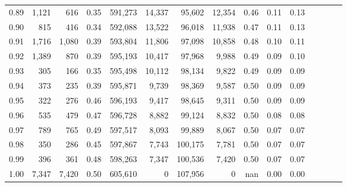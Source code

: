 \begin{tabular}{rrrcrrrrrrrrrrr}
0.89 &   1,121 &    616 &                                       0.35 &  591,273 &   14,337 &   95,602 &   12,354 &  0.46 &  0.11 &                         0.13 \\
0.90 &     815 &    416 &                                       0.34 &  592,088 &   13,522 &   96,018 &   11,938 &  0.47 &  0.11 &                         0.13 \\
0.91 &   1,716 &  1,080 &                                       0.39 &  593,804 &   11,806 &   97,098 &   10,858 &  0.48 &  0.10 &                         0.11 \\
0.92 &   1,389 &    870 &                                       0.39 &  595,193 &   10,417 &   97,968 &    9,988 &  0.49 &  0.09 &                         0.10 \\
0.93 &     305 &    166 &                                       0.35 &  595,498 &   10,112 &   98,134 &    9,822 &  0.49 &  0.09 &                         0.09 \\
0.94 &     373 &    235 &                                       0.39 &  595,871 &    9,739 &   98,369 &    9,587 &  0.50 &  0.09 &                         0.09 \\
0.95 &     322 &    276 &                                       0.46 &  596,193 &    9,417 &   98,645 &    9,311 &  0.50 &  0.09 &                         0.09 \\
0.96 &     535 &    479 &                                       0.47 &  596,728 &    8,882 &   99,124 &    8,832 &  0.50 &  0.08 &                         0.08 \\
0.97 &     789 &    765 &                                       0.49 &  597,517 &    8,093 &   99,889 &    8,067 &  0.50 &  0.07 &                         0.07 \\
0.98 &     350 &    286 &                                       0.45 &  597,867 &    7,743 &  100,175 &    7,781 &  0.50 &  0.07 &                         0.07 \\
0.99 &     396 &    361 &                                       0.48 &  598,263 &    7,347 &  100,536 &    7,420 &  0.50 &  0.07 &                         0.07 \\
1.00 &   7,347 &  7,420 &                                       0.50 &  605,610 &        0 &  107,956 &        0 &   nan &  0.00 &                         0.00 \\
\bottomrule
\end{tabular}
